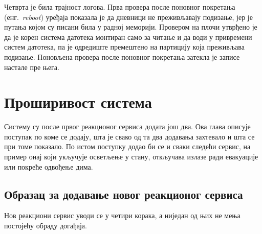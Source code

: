 \documentclass[12pt,oneside]{memoir}
\begin{document}
Четврта је била трајност логова. Прва провера после поновног покретања
(енг.\ \textit{reboot}) уређаја показала је да дневници не преживљавају подизање, јер је
путања којом су писани била у радној меморији. Провером на плочи утврђено је да је корен
система датотека монтиран само за читање и да  води у привремени систем
датотека, па је одредиште премештено на партицију која преживљава подизање. Поновљена
провера после поновног покретања затекла је записе настале пре њега.

\chapter{Проширивост система}
\label{chp:prosirivost}
Систему су после првог реакционог сервиса додата још два. Ова глава описује поступак
по коме се додају, шта је свако од та два додавања захтевало и шта се при томе 
показало. По истом поступку додао би се и сваки следећи сервис, на пример онај који укључује
осветљење у стану, откључава излазе ради евакуације или покреће одвођење дима.

\section{Образац за додавање новог реакционог сервиса}
\label{sec:obrazac-prosirenja}

Нов реакциони сервис уводи се у четири корака, а ниједан од њих не мења постојећу обраду
догађаја.
\end{document}
